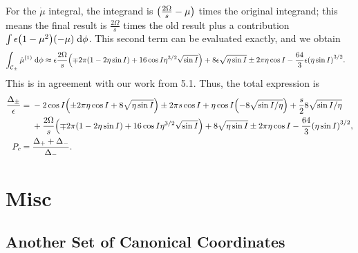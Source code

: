 \documentclass[11pt,
        usenames, %
        dvipsnames %
    ]{article}
\DeclarePairedDelimiter\p{\lparen}{\rparen}
\begin{document}
For the $\dot{\mu}$ integral, the integrand is $\p*{\frac{2\Omega}{s} - \mu}$
times the original integrand; this means the final result is $\frac{2\Omega}{s}$
times the old result plus a contribution $\int \epsilon \p*{1 - \mu^2}\p*{-\mu}
\;\mathrm{d}\phi$. This second term can be evaluated exactly, and we obtain
\begin{align*}
    \int_{\mathcal{C}_{\pm}}\dot{\mu}^{(1)}\;\mathrm{d}\phi
        &\approx \epsilon\frac{2\Omega}{s}\p*{\mp 2\pi\p*{1 - 2\eta \sin I}
            + 16\cos I \eta^{3/2}\sqrt{\sin I}}
            + 8\epsilon\sqrt{\eta \sin I}
            \pm 2 \pi \eta \cos I
            - \frac{64}{3}\epsilon \p*{\eta \sin I}^{3/2}.
\end{align*}
This is in agreement with our work from 5.1. Thus, the total expression is
\begin{align}
    \frac{\Delta_{\pm}}{\epsilon} ={}&
        -2\cos I\p*{\pm 2\pi \eta \cos I + 8\sqrt{\eta \sin I}}
        \pm 2\pi s\cos I
        + \eta \cos I \p*{-8\sqrt{\sin I / \eta}}
            + \frac{s}{2}8\sqrt{\sin I/\eta}\nonumber\\
        &+ \frac{2\Omega}{s}\p*{\mp 2\pi\p*{1 - 2\eta \sin I}
            + 16\cos I \eta^{3/2}\sqrt{\sin I}}
            + 8\sqrt{\eta \sin I}
            \pm 2 \pi \eta \cos I
            - \frac{64}{3} \p*{\eta \sin I}^{3/2},\\
    P_c ={}& \frac{\Delta_+ + \Delta_-}{\Delta_-}.
\end{align}

\section{Misc}

\subsection{Another Set of Canonical Coordinates}
\end{document}
